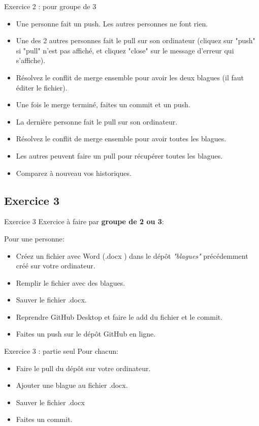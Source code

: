 \documentclass{beamer}
\begin{document}
\begin{frame}{Exercice 2 : pour groupe de 3}
    \begin{itemize}
        \item Une personne fait un push. Les autres personnes ne font rien.
        \item Une des 2 autres personnes fait le pull sur son ordinateur
            (cliquez sur "push" si "pull" n'est pas affiché, et cliquez "close" sur le message d'erreur qui s'affiche).
        \item Résolvez le conflit de merge ensemble pour avoir les deux blagues (il faut éditer le fichier).
        \item Une fois le merge terminé, faites un commit et un push.
        \item La dernière personne fait le pull sur son ordinateur.
        \item Résolvez le conflit de merge ensemble pour avoir toutes les blagues.
        \item Les autres peuvent faire un pull pour récupérer toutes les blagues.
        \item Comparez à nouveau vos historiques.
    \end{itemize}
\end{frame}

\subsection{Exercice 3}
\begin{frame}{Exercice 3}
    Exercice à faire par \textbf{groupe de 2 ou 3}:

    Pour une personne:
    \begin{itemize}
        \item Créez un fichier avec Word (.docx ) dans le dépôt \textit{"blagues"} précédemment créé sur votre ordinateur.
        \item Remplir le fichier avec des blagues.
        \item Sauver le fichier .docx.
        \item Reprendre GitHub Desktop et faire le add du fichier et le commit.
        \item Faites un push sur le dépôt GitHub en ligne.
    \end{itemize}
\end{frame}

\begin{frame}{Exercice 3 : partie seul}
    Pour chacun:
    \begin{itemize}
    \item Faire le pull du dépôt sur votre ordinateur.
    \item Ajouter une blague au fichier .docx.
    \item Sauver le fichier .docx
    \item Faites un commit.
    \end{itemize}
\end{frame}
\end{document}
